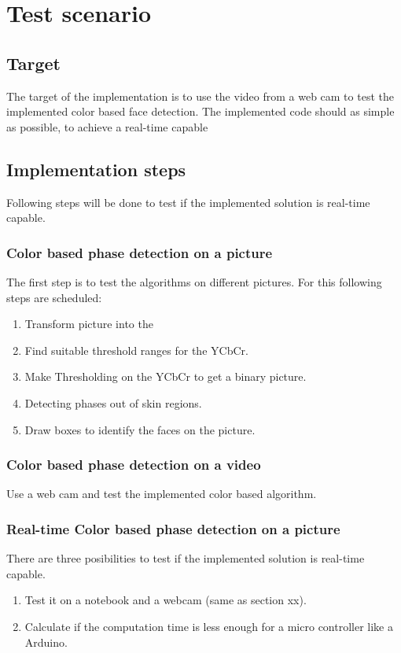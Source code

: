 \documentclass[Bachelorarbeit.tex]{subfiles}
\begin{document}
\chapter{Test scenario}
\section{Target}
The target of the implementation is to use the video from a web cam to test the implemented color based face detection. The implemented code should as simple as possible, to achieve a real-time capable 

\section{Implementation steps}
Following steps will be done to test if the implemented solution is real-time capable.

\subsection{Color based phase detection on a picture}
The first step is to test the algorithms on different pictures. For this following steps are scheduled:
\begin{enumerate}
\item Transform picture into the
\item Find suitable threshold ranges for the YCbCr.
\item Make Thresholding on the YCbCr to get a binary picture.
\item Detecting phases out of skin regions.
\item Draw boxes to identify the faces on the picture.
\end{enumerate}
\subsection{Color based phase detection on a video}
Use a web cam and test the implemented color based algorithm.
\subsection{Real-time Color based phase detection on a picture}
There are three posibilities to test if the implemented solution is real-time capable.
\begin{enumerate}
\item Test it on a notebook and a webcam (same as section xx).
\item Calculate if the computation time is less enough for a micro controller like a Arduino.
\end{enumerate}
\end{document}
